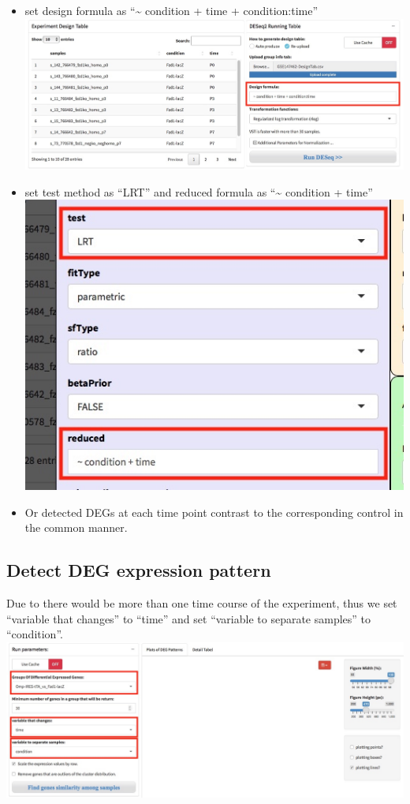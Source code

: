 \documentclass[
  a4paper,
  oneside]{book}
\providecommand{\tightlist}{%
  \setlength{\itemsep}{0pt}\setlength{\parskip}{0pt}}
\begin{document}
\begin{itemize}
\tightlist
\item
  set design formula as ``\textasciitilde{} condition + time + condition:time''
  \includegraphics{images/degp_multiple_factor_design.jpeg}
\item
  set test method as ``LRT'' and reduced formula as ``\textasciitilde{} condition + time''
  \includegraphics{images/degp_multiple_factor_adpt.jpeg}
\item
  Or detected DEGs at each time point contrast to the corresponding control in the common manner.
\end{itemize}

\hypertarget{detect-deg-expression-pattern-1}{%
\subsection{Detect DEG expression pattern}\label{detect-deg-expression-pattern-1}}

Due to there would be more than one time course of the experiment, thus we set ``variable that changes'' to ``time'' and set ``variable to separate samples'' to ``condition''.
\includegraphics{images/degp_multiple_factor_detect.jpeg}
\end{document}
